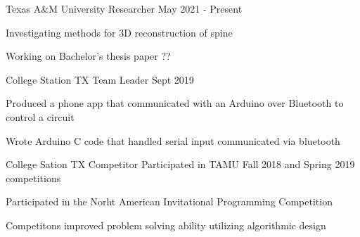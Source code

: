 \documentclass[11pt]{article} %
\begin{document}
\begin{description}
\squish

{Texas A$\&$M University}
{Researcher}
{May 2021 - Present}

Investigating methods for 3D reconstruction of spine

Working on Bachelor's thesis paper ??

{College Station TX}
{Team Leader}
{Sept 2019}

Produced a phone app that communicated with an Arduino over Bluetooth to control a circuit

Wrote Arduino C code that handled serial input communicated via bluetooth

{College Sation TX}
{Competitor}
{}
Participated in TAMU Fall 2018 and Spring 2019 competitions

Participated in the Norht American Invitational Programming Competition

Competitons improved problem solving ability utilizing algorithmic design


\end{description}


%
%
%
%
%
\end{document}
